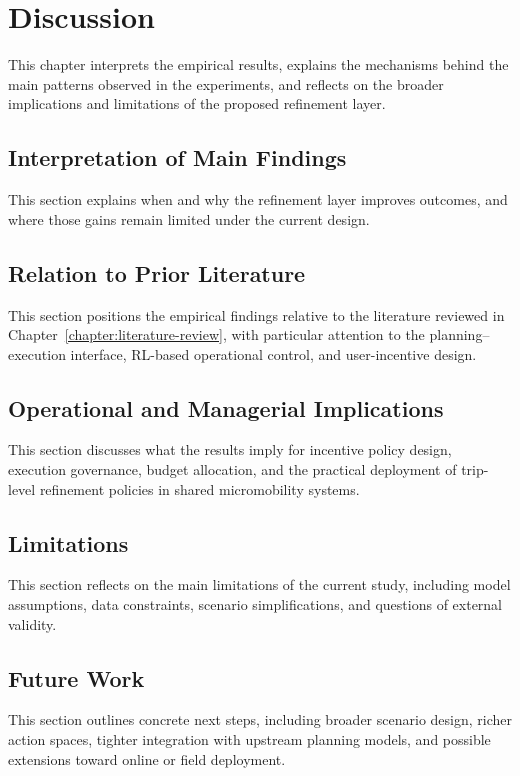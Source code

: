 \chapter{Discussion}
\label{chapter:discussion}

This chapter interprets the empirical results, explains the mechanisms behind the main patterns observed in the experiments, and reflects on the broader implications and limitations of the proposed refinement layer.

\section{Interpretation of Main Findings}

This section explains when and why the refinement layer improves outcomes, and where those gains remain limited under the current design.

\section{Relation to Prior Literature}

This section positions the empirical findings relative to the literature reviewed in Chapter~\ref{chapter:literature-review}, with particular attention to the planning--execution interface, RL-based operational control, and user-incentive design.

\section{Operational and Managerial Implications}

This section discusses what the results imply for incentive policy design, execution governance, budget allocation, and the practical deployment of trip-level refinement policies in shared micromobility systems.

\section{Limitations}

This section reflects on the main limitations of the current study, including model assumptions, data constraints, scenario simplifications, and questions of external validity.

\section{Future Work}

This section outlines concrete next steps, including broader scenario design, richer action spaces, tighter integration with upstream planning models, and possible extensions toward online or field deployment.
